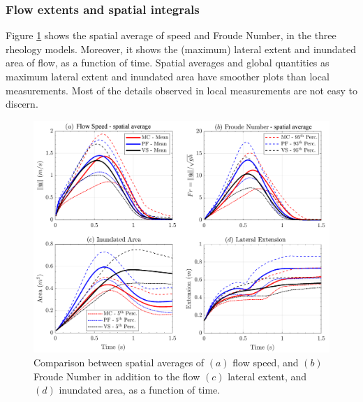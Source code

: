 \documentclass{article}
\begin{document}
\subsubsection{Flow extents and spatial integrals}
Figure \ref{fig:Ramp-spatial} shows the spatial average of speed and Froude Number, in the three rheology models. Moreover, it shows the (maximum) lateral extent and inundated area of flow, as a function of time. Spatial averages and global quantities as maximum lateral extent and inundated area have smoother plots than local measurements. Most of the details observed in local measurements are not easy to discern.
\begin{figure}[H]
        \centering
        \includegraphics[width=1\textwidth]{InclinedPlane/AveragedMeasurments/Averaged_MeasuresIncline.png}
        \caption{Comparison between spatial averages of $(a)$ flow speed, and $(b)$ Froude Number in addition to the flow $(c)$ lateral extent, and $(d)$ inundated area, as a function of time.}
        \label{fig:Ramp-spatial}
\end{figure}
\end{document}
